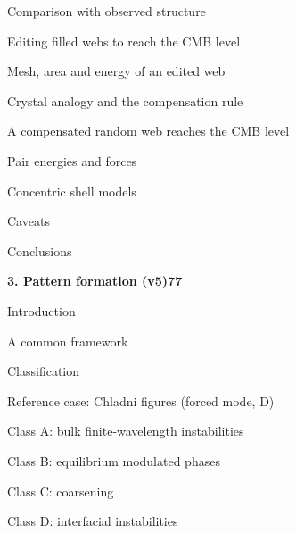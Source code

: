 \documentclass[11pt,a4paper]{article}
\begin{document}
{\noindent\hspace*{1.2em}Comparison with observed structure\par
\noindent\hspace*{1.2em}Editing filled webs to reach the CMB level\par
\noindent\hspace*{1.2em}Mesh, area and energy of an edited web\par
\noindent\hspace*{1.2em}Crystal analogy and the compensation rule\par
\noindent\hspace*{1.2em}A compensated random web reaches the CMB level\par
\noindent\hspace*{1.2em}Pair energies and forces\par
\noindent\hspace*{1.2em}Concentric shell models\par
\noindent\hspace*{1.2em}Caveats\par
\noindent\hspace*{1.2em}Conclusions\par
\noindent\textbf{3. Pattern formation (v5)}\dotfill\textbf{77}\par\smallskip
\noindent\hspace*{1.2em}Introduction\par
\noindent\hspace*{1.2em}A common framework\par
\noindent\hspace*{1.2em}Classification\par
\noindent\hspace*{1.2em}Reference case: Chladni figures (forced mode, D)\par
\noindent\hspace*{1.2em}Class A: bulk finite-wavelength instabilities\par
\noindent\hspace*{1.2em}Class B: equilibrium modulated phases\par
\noindent\hspace*{1.2em}Class C: coarsening\par
\noindent\hspace*{1.2em}Class D: interfacial instabilities\par
}
\end{document}
